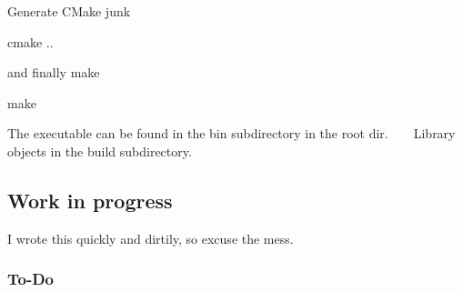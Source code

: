  Generate C\+Make junk \begin{DoxyVerb} cmake ..\end{DoxyVerb}
 and finally make \begin{DoxyVerb} make\end{DoxyVerb}
 The executable can be found in the bin subdirectory in the root dir. ~\newline
~\newline
 Library objects in the build subdirectory. \hypertarget{index_progress_sec}{}\subsection{Work in progress}\label{index_progress_sec}
I wrote this quickly and dirtily, so excuse the mess. \hypertarget{index_todo_sec}{}\subsubsection{To-\/\+Do}\label{index_todo_sec}

